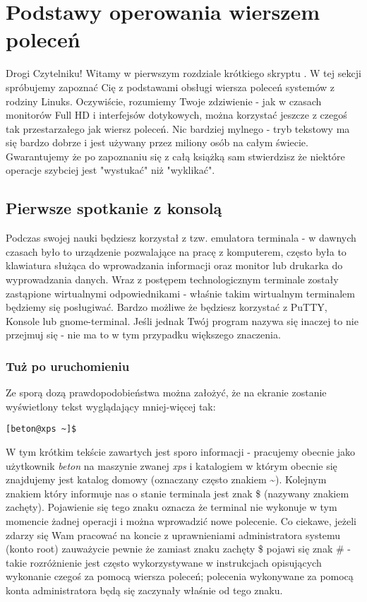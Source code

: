 \chapter{Podstawy operowania wierszem poleceń}
Drogi Czytelniku! \newline
Witamy w pierwszym rozdziale krótkiego skryptu \doctitle.
W tej sekcji spróbujemy zapoznać Cię z podstawami obsługi wiersza poleceń systemów z rodziny Linuks. Oczywiście, rozumiemy Twoje zdziwienie - jak w czasach monitorów Full HD i interfejsów dotykowych, można korzystać jeszcze z czegoś tak przestarzałego jak wiersz poleceń. Nic bardziej mylnego - tryb tekstowy ma się bardzo dobrze i jest używany przez miliony osób na całym świecie. Gwarantujemy że po zapoznaniu się z całą książką sam stwierdzisz że niektóre operacje szybciej jest "wystukać" niż "wyklikać".

\section{Pierwsze spotkanie z konsolą}
Podczas swojej nauki będziesz korzystał z tzw. emulatora terminala - w dawnych czasach było to urządzenie pozwalające na pracę z komputerem, często była to klawiatura służąca do wprowadzania informacji oraz monitor lub drukarka do wyprowadzania danych. Wraz z postępem technologicznym terminale zostały zastąpione wirtualnymi odpowiednikami - właśnie takim wirtualnym terminalem będziemy się posługiwać. Bardzo możliwe że będziesz korzystać z PuTTY, Konsole lub gnome-terminal. Jeśli jednak Twój program nazywa się inaczej to nie przejmuj się - nie ma to w tym przypadku większego znaczenia.

\subsection{Tuż po uruchomieniu}
Ze sporą dozą prawdopodobieństwa można założyć, że na ekranie zostanie wyświetlony tekst wyglądający mniej-więcej tak:
\begin{verbatim}
[beton@xps ~]$ 
\end{verbatim}
W tym krótkim tekście zawartych jest sporo informacji - pracujemy obecnie jako użytkownik \textit{beton} na maszynie zwanej \textit{xps} i katalogiem w którym obecnie się znajdujemy jest katalog domowy (oznaczany często znakiem \textasciitilde). Kolejnym znakiem który informuje nas o stanie terminala jest znak \$ (nazywany znakiem zachęty). Pojawienie się tego znaku oznacza że terminal nie wykonuje w tym momencie żadnej operacji i można wprowadzić nowe polecenie. Co ciekawe, jeżeli zdarzy się Wam pracować na koncie z uprawnieniami administratora systemu (konto root) zauważycie pewnie że zamiast znaku zachęty \$ pojawi się znak \# - takie rozróżnienie jest często wykorzystywane w instrukcjach opisujących wykonanie czegoś za pomocą wiersza poleceń; polecenia wykonywane za pomocą konta administratora będą się zaczynały właśnie od tego znaku.

